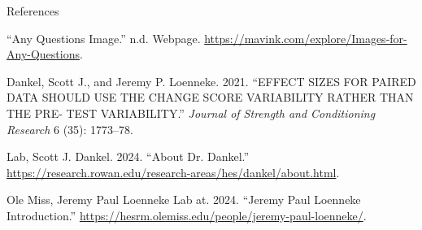 \documentclass[
  ignorenonframetext,
  aspectratio=169,
]{beamer}
\newlength{\cslhangindent}
\newlength{\cslentryspacingunit} %
\newenvironment{CSLReferences}[2] %
 {%
  \setlength{\parindent}{0pt}
  \ifodd #1
  \let\oldpar\par
  \def\par{\hangindent=\cslhangindent\oldpar}
  \fi
  \setlength{\parskip}{#2\cslentryspacingunit}
 }%
 {}
\begin{document}
\begin{frame}{References}
\protect\hypertarget{references}{}
\hypertarget{refs}{}
\begin{CSLReferences}{1}{0}
\leavevmode{}%
{``Any Questions Image.''} n.d. Webpage.
\url{https://mavink.com/explore/Images-for-Any-Questions}.

\leavevmode{}%
Dankel, Scott J., and Jeremy P. Loenneke. 2021. {``EFFECT SIZES FOR
PAIRED DATA SHOULD USE THE CHANGE SCORE VARIABILITY RATHER THAN THE PRE-
TEST VARIABILITY.''} \emph{Journal of Strength and Conditioning
Research} 6 (35): 1773--78.

\leavevmode{}%
Lab, Scott J. Dankel. 2024. {``About Dr. Dankel.''}
\url{https://research.rowan.edu/research-areas/hes/dankel/about.html}.

\leavevmode{}%
Ole Miss, Jeremy Paul Loenneke Lab at. 2024. {``Jeremy Paul Loenneke
Introduction.''}
\url{https://hesrm.olemiss.edu/people/jeremy-paul-loenneke/}.

\end{CSLReferences}
\end{frame}
\end{document}
